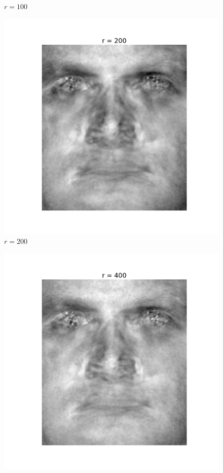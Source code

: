 \begin{enumerate}[label=\arabic*.]
\begin{mdframed}[style=MyFrame]
\begin{figure}[H]
                    \caption{$r=100$}
                \end{figure}
                \begin{figure}[H]
                    \includegraphics[height=0.35\textheight]{../media/r-200-2.png}
                    \caption{$r=200$}
                \end{figure}
                \begin{figure}[H]
                    \includegraphics[height=0.35\textheight]{../media/r-400-2.png}

\end{figure}
\end{mdframed}
\end{enumerate}
